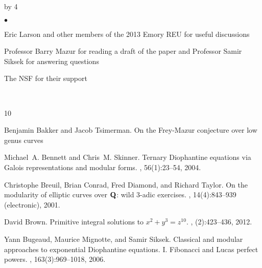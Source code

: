 \documentclass[12pt]{scrartcl}
\newenvironment{citemize}{
\begin{list}{$\bullet$}{\setlength{\itemsep}{0pt} \setlength{\rightmargin}{0pt} \setlength{\leftmargin}{0.5\labelwidth} \setlength{\topsep}{0pt}}
}{\end{list}}
\def\anzspalten{4}
\newlength{\kastenwidth}
\newenvironment{kasten}{%
  \begin{lrbox}{\dummybox}%
    \begin{minipage}{0.96\linewidth}}%
    {\end{minipage}%
  \end{lrbox}%
  \raisebox{-\depth}{\psshadowbox[framesep=1em]{\usebox{\dummybox}}}\\[0.5em]}
\newenvironment{spalte}{%
  \setlength\kastenwidth{1.2\textwidth}
  \divide\kastenwidth by \anzspalten
  \begin{minipage}[t]{\kastenwidth}}{\end{minipage}\hfill}
\begin{document}
\begin{lrbox}{\spalten}
{\begin{spalte}
\begin{kasten}
\begin{citemize}
\item Eric Larson and other members of the 2013 Emory REU for useful discussions

\item Professor Barry Mazur for reading a draft of the paper and Professor Samir Siksek for answering questions

\item The NSF for their support
\end{citemize}
\end{kasten}

\begin{kasten}
         {\small

\begin{thebibliography}{10}

Benjamin Bakker and Jacob Tsimerman.
\newblock On the Frey-Mazur conjecture over low genus curves


Michael~A. Bennett and Chris~M. Skinner.
\newblock Ternary {D}iophantine equations via {G}alois representations and
  modular forms.
, 56(1):23--54, 2004.

Christophe Breuil, Brian Conrad, Fred Diamond, and Richard Taylor.
\newblock On the modularity of elliptic curves over {$\bold Q$}: wild 3-adic
  exercises.
, 14(4):843--939 (electronic), 2001.

David Brown.
\newblock Primitive integral solutions to {$x^2+y^3=z^{10}$}.
, (2):423--436, 2012.


Yann Bugeaud, Maurice Mignotte, and Samir Siksek.
\newblock Classical and modular approaches to exponential {D}iophantine
  equations. {I}. {F}ibonacci and {L}ucas perfect powers.
, 163(3):969--1018, 2006.



\end{thebibliography}}
\end{kasten}
\end{spalte}}
\end{lrbox}
\end{document}
